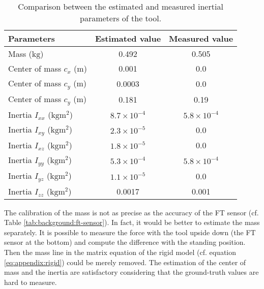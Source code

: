 \documentclass[/home/francois/latex/report/main.tex]{subfiles}
\begin{document}
\begin{table}[h]
  \begin{center}
    \renewcommand{\arraystretch}{1.2} %
    \begin{tabular}{l|c|c} %
      \textbf{Parameters} & \textbf{Estimated value} & \textbf{Measured value}\\
      \hline
      Mass ($\si{\kilogram}$)  & 0.492 & 0.505 \\
      \hline
      Center of mass $c_x$ ($\si{\meter}$)  & 0.001 & 0.0 \\
      \hline
      Center of mass $c_y$ ($\si{\meter}$)  & 0.0003 & 0.0 \\
      \hline
      Center of mass $c_y$ ($\si{\meter}$)  & 0.181 & 0.19 \\
      \hline
      Inertia $I_{xx}$ ($\si{\kilogram\meter\squared}$)  & $8.7 \times 10^{-4}$ & $5.8 \times 10^{-4}$ \\
      \hline
      Inertia $I_{xy}$ ($\si{\kilogram\meter\squared}$)  & $2.3 \times 10^{-5}$ & 0.0 \\
      \hline
      Inertia $I_{xz}$ ($\si{\kilogram\meter\squared}$)  & $1.8 \times 10^{-5}$ & 0.0 \\
      \hline
      Inertia $I_{yy}$ ($\si{\kilogram\meter\squared}$)  & $5.3 \times 10^{-4}$ & $5.8 \times 10^{-4}$ \\
      \hline
      Inertia $I_{yz}$ ($\si{\kilogram\meter\squared}$)  & $1.1 \times 10^{-5}$ & 0.0 \\
      \hline
      Inertia $I_{zz}$ ($\si{\kilogram\meter\squared}$)  & 0.0017 & 0.001 \\
      \hline
    \end{tabular}
  \end{center}
  \caption{Comparison between the estimated and measured inertial parameters of the tool.\label{tab:results:calibration-tool}}
\end{table}

The calibration of the mass is not as precise as the accuracy of the \ac{FT} sensor (cf. Table \ref{tab:background:ft-sensor}). In fact, it would be better to estimate the mass separately. It is possible to measure the force with the tool upside down (the \ac{FT} sensor at the bottom) and compute the difference with the standing position. Then the mass line in the matrix equation of the rigid model (cf. equation \ref{eq:appendix:rigid}) could be merely removed. The estimation of the center of mass and the inertia are satisfactory considering that the ground-truth values are hard to measure.
\end{document}
